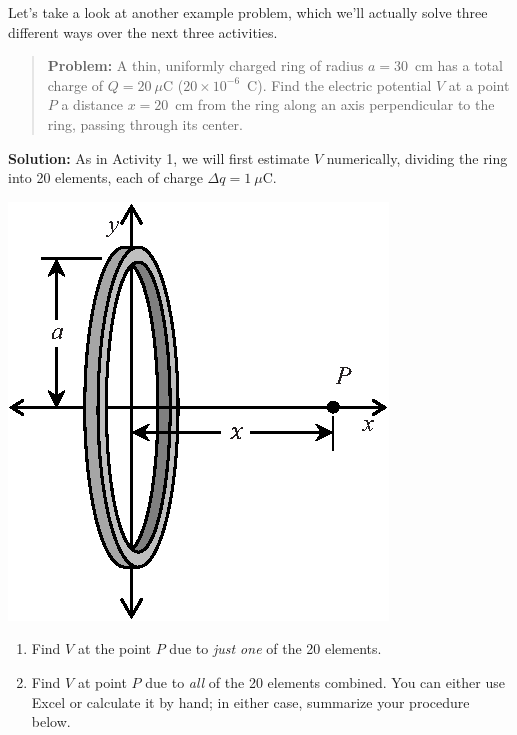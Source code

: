 \begin{minipage}{0.65\textwidth}
Let's take a look at another example problem, which we'll actually solve three different ways over the next three activities.  

\begin{quote}
\textbf{Problem:} A thin, uniformly charged ring of radius $a=30$~cm has a total charge of $Q = 20\ \mu$C ($20
\times 10^{-6}$~C). Find the electric potential $V$ at a point $P$ a distance $x = 20$~cm from the ring along an axis perpendicular to the ring, passing through its center.
\end{quote}

\textbf{Solution:} As in Activity 1, we will first estimate $V$ numerically, dividing the ring into 20 elements, each of charge $\Delta q = 1\ \mu$C.

\end{minipage}
\begin{minipage}{0.34\textwidth}
\vspace{-0.3in}
\raggedleft \includegraphics[scale=0.9]{potential_charge_distributions/ring_integral.eps}
\end{minipage}

\begin{enumerate}[labparts]

\item Find $V$ at the point $P$ due to \textit{just one} of the 20 elements.
\answerspace{0.4in}

\item Find $V$ at  point $P$ due to \textit{all} of the 20 elements combined.  You can either use Excel or calculate it by hand; in either case, summarize your procedure below.
\answerspace{0.7in}

\end{enumerate}

